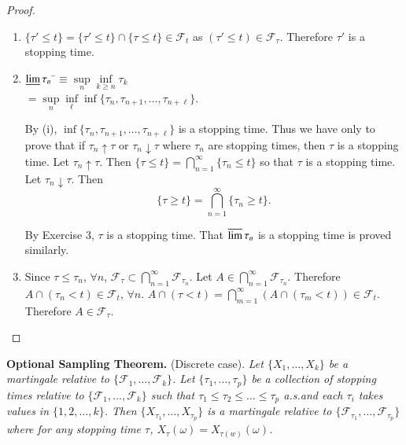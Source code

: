\begin{proof}
\begin{enumerate}
\item $\{\tau'\leq t\}=\{\tau'\leq t\}\cap \{\tau\leq t\}\in
  \mathscr{F}_{t}$ as $(\tau'\leq t)\in \mathscr{F}_{\tau}$. Therefore
  $\tau'$ is a stopping time.

\item \begin{tabbing}
$\varliminf \tau_{n}$ \=$\equiv\sup\limits_{n}\inf\limits_{k\geq
    n}\tau_{k}$\\[5pt] 
\>$=\sup\limits_{n}\inf\limits_{\ell}\inf
\{\tau_{n},\tau_{n+1},\ldots,\tau_{n+\ell}\}$. 
\end{tabbing}


By (i), $\inf \{\tau_{n},\tau_{n+1},\ldots,\tau_{n+\ell}\}$ is a
stopping time. Thus we have only to prove that if $\tau_{n}\uparrow
\tau$ or $\tau_{n}\downarrow \tau$ where $\tau_{n}$ are stopping
times, then $\tau$ is a stopping time. Let $\tau_{n}\uparrow
\tau$. Then $\{\tau\leq
t\}=\bigcap\limits^{\infty}_{n=1}\{\tau_{n}\leq t\}$ so that $\tau$ is
a stopping time. Let $\tau_{n}\downarrow \tau$. Then
$$
\{\tau\geq t\}=\bigcap\limits^{\infty}_{n=1}\{\tau_{n}\geq t\}.
$$

By Exercise 3, $\tau$ is a stopping time. That $\varlimsup \tau_{n}$
is a stopping time is proved similarly.

\item Since $\tau\leq \tau_{n}$, $\forall n$,
  $\mathscr{F}_{\tau}\subset
  \bigcap\limits^{\infty}_{n=1}\mathscr{F}_{\tau_{n}}$. Let $A\in
  \bigcap\limits^{\infty}_{n=1}\mathscr{F}_{\tau_{n}}$. Therefore
  $A\cap (\tau_{n}<t)\in \mathscr{F}_{t}$, $\forall n$. $A\cap
  (\tau<t)=\bigcap\limits^{\infty}_{m=1}(A\cap (\tau_{m}<t))\in
  \mathscr{F}_{t}$. Therefore $A\in \mathscr{F}_{\tau}$. 
\end{enumerate}
\end{proof}

\noindent
{\bf Optional Sampling Theorem.} (Discrete case). {\em Let
$\{X_{1},\ldots,X_{k}\}$ be a martingale relative to
  $\{\mathscr{F}_{1},\ldots,\mathscr{F}_{k}\}$. Let
  $\{\tau_{1},\ldots,\tau_{p}\}$ be a collection of stopping times
  relative to $\{\mathscr{F}_{1},\ldots,\mathscr{F}_{k}\}$ such that
  $\tau_{1}\leq \tau_{2}\leq \ldots \leq \tau_{p}$\pageoriginale
  a.s.\@ and each $\tau_{i}$ takes values in $\{1,2,\ldots,k\}$. Then
  $\{X_{\tau_{1}},\ldots,X_{\tau_{p}}\}$ is a martingale relative to
  $\{\mathscr{F}_{\tau_{1}},\ldots,\mathscr{F}_{\tau_{p}}\}$ where for
  any stopping time $\tau$, $X_{\tau}(\omega)=X_{\tau(w)}(\omega)$.}

